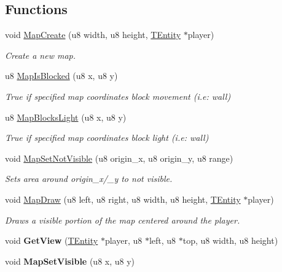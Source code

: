 \subsection*{Functions}
\begin{DoxyCompactItemize}
\item 
void \mbox{\hyperlink{group__GameMap_ga0a25d4a00a01f6a01f415c8cf22b17d2}{Map\+Create}} (u8 width, u8 height, \mbox{\hyperlink{structTEntity}{T\+Entity}} $\ast$player)
\begin{DoxyCompactList}\small\item\em Create a new map. \end{DoxyCompactList}\item 
u8 \mbox{\hyperlink{group__GameMap_ga3eae0d3c0cf7368023838ed2dfc5e3c8}{Map\+Is\+Blocked}} (u8 x, u8 y)
\begin{DoxyCompactList}\small\item\em True if specified map coordinates block movement (i.\+e\+: wall) \end{DoxyCompactList}\item 
u8 \mbox{\hyperlink{group__GameMap_ga4a96cfd7d7f5dab759c0274d498ca927}{Map\+Blocks\+Light}} (u8 x, u8 y)
\begin{DoxyCompactList}\small\item\em True if specified map coordinates block light (i.\+e\+: wall) \end{DoxyCompactList}\item 
\mbox{\label{group__GameMap_ga806e9ea5321e82e566b161fcbd5e2e2d}} 
void \mbox{\hyperlink{group__GameMap_ga806e9ea5321e82e566b161fcbd5e2e2d}{Map\+Set\+Not\+Visible}} (u8 origin\+\_\+x, u8 origin\+\_\+y, u8 range)
\begin{DoxyCompactList}\small\item\em Sets area around origin\+\_\+x/\+\_\+y to not visible. \end{DoxyCompactList}\item 
void \mbox{\hyperlink{group__GameMap_ga300f688f7b1989dba73d6bae2772a7dc}{Map\+Draw}} (u8 left, u8 right, u8 width, u8 height, \mbox{\hyperlink{structTEntity}{T\+Entity}} $\ast$player)
\begin{DoxyCompactList}\small\item\em Draws a visible portion of the map centered around the player. \end{DoxyCompactList}\item 
\mbox{\label{group__GameMap_gae17467d65d599928e1b7bfa3ddeee49f}} 
void {\bfseries Get\+View} (\mbox{\hyperlink{structTEntity}{T\+Entity}} $\ast$player, u8 $\ast$left, u8 $\ast$top, u8 width, u8 height)
\item 
\mbox{\label{group__GameMap_gaaf6d5d23473322d54274ad7aa393adcd}} 
void {\bfseries Map\+Set\+Visible} (u8 x, u8 y)
\end{DoxyCompactItemize}
